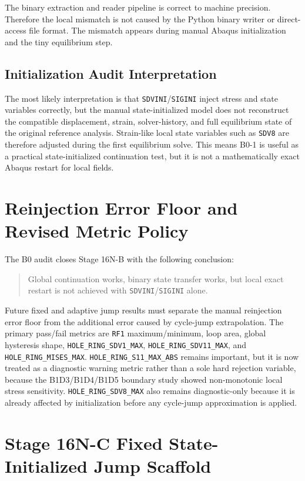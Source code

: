 \documentclass[11pt,a4paper]{article}
\newcommand{\code}[1]{\texttt{#1}}
\begin{document}
The binary extraction and reader pipeline is correct to machine precision. Therefore the local mismatch is not caused by the Python binary writer or direct-access file format. The mismatch appears during manual Abaqus initialization and the tiny equilibrium step.

\subsection{Initialization Audit Interpretation}

The most likely interpretation is that \code{SDVINI}/\code{SIGINI} inject stress and state variables correctly, but the manual state-initialized model does not reconstruct the compatible displacement, strain, solver-history, and full equilibrium state of the original reference analysis. Strain-like local state variables such as \code{SDV8} are therefore adjusted during the first equilibrium solve. This means B0-1 is useful as a practical state-initialized continuation test, but it is not a mathematically exact Abaqus restart for local fields.

\section{Reinjection Error Floor and Revised Metric Policy}

The B0 audit closes Stage 16N-B with the following conclusion:

\begin{quote}
Global continuation works, binary state transfer works, but local exact restart is not achieved with \code{SDVINI}/\code{SIGINI} alone.
\end{quote}

Future fixed and adaptive jump results must separate the manual reinjection error floor from the additional error caused by cycle-jump extrapolation. The primary pass/fail metrics are \code{RF1} maximum/minimum, loop area, global hysteresis shape, \code{HOLE\_RING\_SDV1\_MAX}, \code{HOLE\_RING\_SDV11\_MAX}, and \code{HOLE\_RING\_MISES\_MAX}. \code{HOLE\_RING\_S11\_MAX\_ABS} remains important, but it is now treated as a diagnostic warning metric rather than a sole hard rejection variable, because the B1D3/B1D4/B1D5 boundary study showed non-monotonic local stress sensitivity. \code{HOLE\_RING\_SDV8\_MAX} also remains diagnostic-only because it is already affected by initialization before any cycle-jump approximation is applied.

\section{Stage 16N-C Fixed State-Initialized Jump Scaffold}
\end{document}
